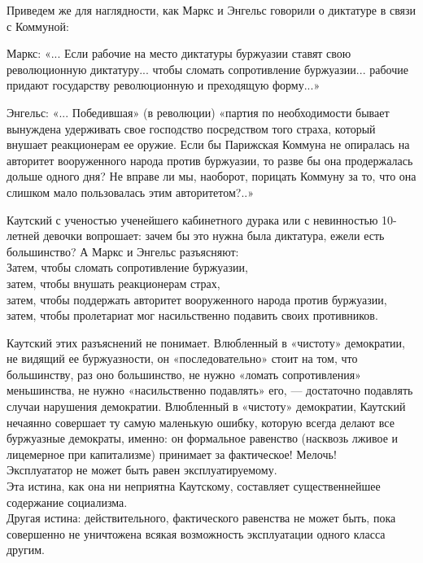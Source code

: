 \documentclass[12pt]{article}
\newcommand{\parnum}{(\arabic{parcount})}
\newcounter{parcount}
\newenvironment{parnumbers}{%
  \par%
  \everypar{\noindent \stepcounter{parcount}\marginpar[]{\parnum}}%
}{}
\begin{document}
\begin{parnumbers}
Приведем же для наглядности, как Маркс и Энгельс говорили о диктатуре в связи с Коммуной:

Маркс: «... Если рабочие на место диктатуры буржуазии ставят свою революционную диктатуру... чтобы сломать сопротивление буржуазии... рабочие придают государству революционную и преходящую форму...»

Энгельс: «... Победившая» (в революции) «партия по необходимости бывает вынуждена удерживать свое господство посредством того страха, который внушает реакционерам ее оружие. Если бы Парижская Коммуна не опиралась на авторитет вооруженного народа против буржуазии, то разве бы она продержалась дольше одного дня? Не вправе ли мы, наоборот, порицать Коммуну за то, что она слишком мало пользовалась этим авторитетом?..»

Каутский с ученостью ученейшего кабинетного дурака или с невинностью 10-летней девочки вопрошает: зачем бы это нужна была диктатура, ежели есть большинство? А Маркс и Энгельс разъясняют:\\
Затем, чтобы сломать сопротивление буржуазии,\\
затем, чтобы внушать реакционерам страх,\\
затем, чтобы поддержать авторитет вооруженного народа против буржуазии, \\
затем, чтобы пролетариат мог насильственно подавить своих противников.

Каутский этих разъяснений не понимает. Влюбленный в «чистоту» демократии, не видящий ее буржуазности, он «последовательно» стоит на том, что большинству, раз оно большинство, не нужно «ломать сопротивления» меньшинства, не нужно «насильственно подавлять» его, — достаточно подавлять случаи нарушения демократии. Влюбленный в «чистоту» демократии, Каутский нечаянно совершает ту самую маленькую ошибку, которую всегда делают все буржуазные демократы, именно: он формальное равенство (насквозь лживое и лицемерное при капитализме) принимает за фактическое! Мелочь! \\
Эксплуататор не может быть равен эксплуатируемому. \\
Эта истина, как она ни неприятна Каутскому, составляет существеннейшее содержание социализма. \\
Другая истина: действительного, фактического равенства не может быть, пока совершенно не уничтожена всякая возможность эксплуатации одного класса другим. \\


\end{parnumbers}
\end{document}
